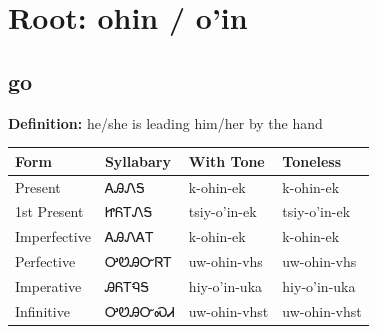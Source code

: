 \documentclass{article}%
\begin{document}
%
\normalsize%
\section*{Root: ohin / o'in}%
\subsection*{go}%
\textbf{Definition: }%
he/she is leading him/her by the hand%
\\[0.5em]%
\begin{tabular}{|l|l|l|l|}%
\hline%
\textbf{Form}&\textbf{Syllabary}&\textbf{With Tone}&\textbf{Toneless}\\%
\hline%
Present&ᎪᎯᏁᎦ&k{-}ohin{-}ek&k{-}ohin{-}ek\\%
1st Present&ᏥᏲᎢᏁᎦ&tsiy{-}o'in{-}ek&tsiy{-}o'in{-}ek\\%
Imperfective&ᎪᎯᏁᎪᎢ&k{-}ohin{-}ek&k{-}ohin{-}ek\\%
Perfective&ᎤᏬᎯᏅᏒᎢ&uw{-}ohin{-}vhs&uw{-}ohin{-}vhs\\%
Imperative&ᎯᏲᎢᏄᎦ&hiy{-}o'in{-}uka&hiy{-}o'in{-}uka\\%
Infinitive&ᎤᏬᎯᏅᏍᏗ&uw{-}ohin{-}vhst&uw{-}ohin{-}vhst\\%
\hline%
\end{tabular}%
\\[1em]%
\end{document}
